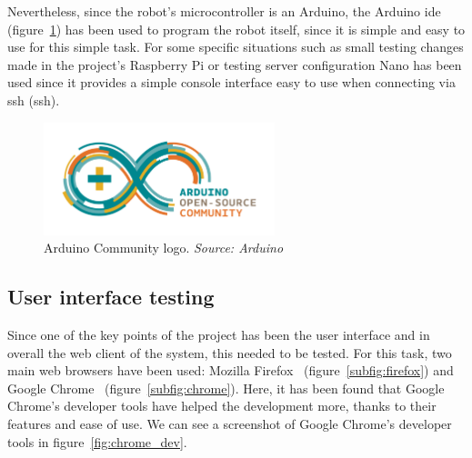 Nevertheless, since the robot's microcontroller is an Arduino, the Arduino
\acrshort{ide}~\cite{arduino_web} (figure~\ref{fig:arduino}) has been used to program the robot
itself, since it is simple and easy to use for this simple task. For some specific situations such
as small testing changes made in the project's Raspberry Pi or testing server configuration Nano
has been used since it provides a simple console interface easy to use when connecting via
\acrshort{ssh} (\acrlong{ssh}).

\begin{figure}[!htbp]
	\centering
	\includegraphics[width=0.6\textwidth]{fig/arduino}
	\caption{Arduino Community logo. \emph{Source: Arduino}}
	\label{fig:arduino}
\end{figure}

\subsection{User interface testing}

Since one of the key points of the project has been the user interface and in overall the web client
of the system, this needed to be tested. For this task, two main web browsers have been used:
Mozilla Firefox~\cite{firefox_web} (figure~\ref{subfig:firefox}) and Google Chrome~\cite{chrome_web}
(figure~\ref{subfig:chrome}). Here, it has been found that Google Chrome's developer tools have
helped the development more, thanks to their features and ease of use. We can see a screenshot of
Google Chrome's developer tools in figure~\ref{fig:chrome_dev}.

